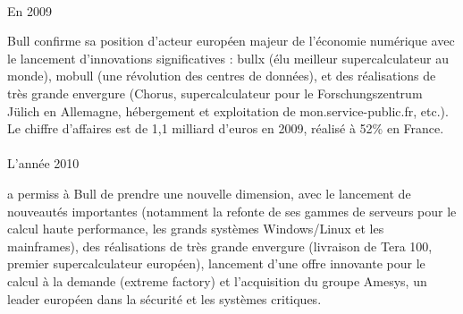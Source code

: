 \documentclass{article}
\begin{document}
		\paragraph{}
		\begin{bf}En 2009\end{bf} Bull confirme sa position d’acteur européen majeur de l’économie numérique avec le 
		lancement d’innovations significatives : bullx (élu meilleur supercalculateur au monde), mobull 
		(une révolution des centres de données), et des réalisations de très grande envergure (Chorus, supercalculateur pour le 
		Forschungszentrum Jülich en Allemagne, hébergement et exploitation de mon.service-public.fr, etc.). Le chiffre 
		d'affaires est de 1,1 milliard d'euros en 2009, réalisé à 52\% en France.
		\paragraph{}
		\begin{bf}L’année 2010\end{bf} a permiss à Bull de prendre une nouvelle dimension, avec le lancement de nouveautés 
		importantes (notamment la refonte de ses gammes de serveurs pour le calcul haute performance, les grands systèmes 
		Windows/Linux et les mainframes), des réalisations de très grande envergure (livraison de Tera 100, premier 
		supercalculateur européen), lancement d’une offre innovante pour le calcul à la demande (extreme factory) et 
		l’acquisition du groupe Amesys, un leader européen dans la sécurité et les systèmes critiques.
\end{document}
